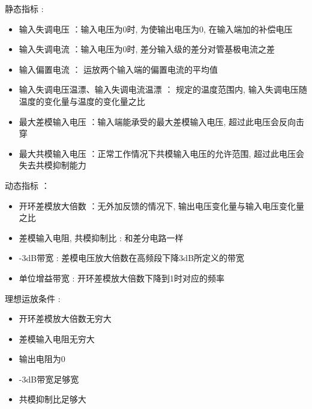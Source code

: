 \documentclass[UTF8, 12pt]{ctexart}
\begin{document}
	静态指标 :
	\begin{itemize}[leftmargin = 4em]
		\item 输入失调电压 ：输入电压为0时,  为使输出电压为0, 在输入端加的补偿电压
		\item 输入失调电流 ：输入电压为0时,  差分输入级的差分对管基极电流之差
		\item 输入偏置电流 ： 运放两个输入端的偏置电流的平均值
		\item 输入失调电压温漂、输入失调电流温漂 ： 规定的温度范围内, 输入失调电压随温度的变化量与温度的变化量之比
		\item 最大差模输入电压 ：输入端能承受的最大差模输入电压,  超过此电压会反向击穿
		\item 最大共模输入电压 ：正常工作情况下共模输入电压的允许范围, 超过此电压会失去共模抑制能力
	\end{itemize}

	动态指标 ：
	\begin{itemize}[leftmargin = 4em]
		\item 开环差模放大倍数 ：无外加反馈的情况下,  输出电压变化量与输入电压变化量之比
		\item 差模输入电阻, 共模抑制比 : 和差分电路一样
		\item -3dB带宽 : 差模电压放大倍数在高频段下降3dB所定义的带宽
		\item 单位增益带宽 : 开环差模放大倍数下降到1时对应的频率
	\end{itemize}

	理想运放条件 :
	\begin{itemize}[leftmargin = 4em]
		\item 开环差模放大倍数无穷大
		\item 差模输入电阻无穷大
		\item 输出电阻为0
		\item -3dB带宽足够宽
		\item 共模抑制比足够大
	\end{itemize}
	
\end{document}
